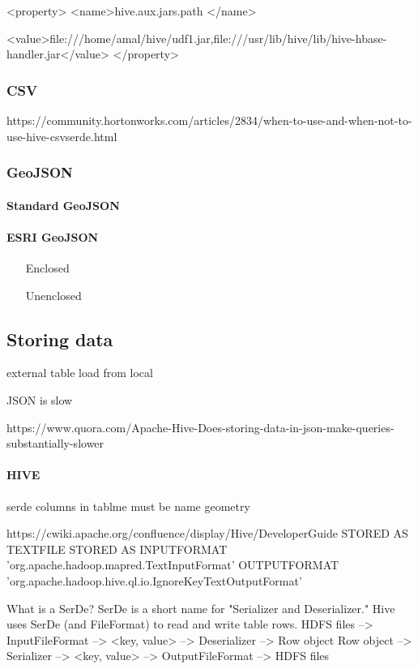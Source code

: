 \documentclass[a4paper,12pt,oneside]{report}
\begin{document}
	<property>
	<name>hive.aux.jars.path </name>
	
	<value>file:///home/amal/hive/udf1.jar,file:///usr/lib/hive/lib/hive-hbase-handler.jar</value>
	</property>
	
	\subsubsection{CSV}
	
	
	https://community.hortonworks.com/articles/2834/when-to-use-and-when-not-to-use-hive-csvserde.html
	\subsubsection{GeoJSON}\label{json}	
	\paragraph{Standard GeoJSON}	
	\paragraph{ESRI GeoJSON}
	\begin{enumerate}
		\item[Enclosed]
		\item[Unenclosed]
	\end{enumerate}
	
	
	\subsection{Storing data}
	external table
	load from local
	
	JSON is slow 
	
	https://www.quora.com/Apache-Hive-Does-storing-data-in-json-make-queries-substantially-slower
	
	\paragraph{HIVE}
	serde
	columns in tablme must be name geometry
	
	
	https://cwiki.apache.org/confluence/display/Hive/DeveloperGuide
	STORED AS TEXTFILE	
	STORED AS INPUTFORMAT
	'org.apache.hadoop.mapred.TextInputFormat'
	OUTPUTFORMAT
	'org.apache.hadoop.hive.ql.io.IgnoreKeyTextOutputFormat'
	
	
	What is a SerDe?
	SerDe is a short name for "Serializer and Deserializer."
	Hive uses SerDe (and FileFormat) to read and write table rows.
	HDFS files --> InputFileFormat --> <key, value> --> Deserializer --> Row object
	Row object --> Serializer --> <key, value> --> OutputFileFormat --> HDFS files
	
\end{document}
